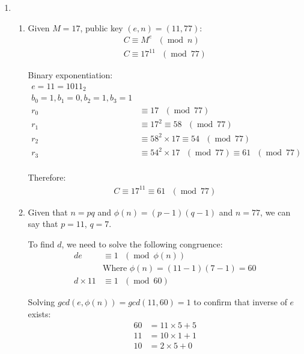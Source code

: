 \documentclass[11pt]{article}
\theoremstyle{definition}
\renewcommand{\pmod}[1]{\mbox{\ $(\ensuremath{\operatorname{mod}}\ {#1})$}}
\begin{document}
\begin{enumerate}
\begin{enumerate}
  \item
    \begin{enumerate}
      \item 
        Given $M = 17$, public key $(e, n) = (11, 77)$:
        \begin{align*}
          C \equiv M^e \pmod{n} \\
          C \equiv 17^{11} \pmod{77}
        \end{align*}

        Binary exponentiation:
        \begin{align*}
          e = 11 = 1011_{2} \\
          b_0 = 1, b_1 = 0, b_2 = 1, b_3 = 1 \\
          r_0 &\equiv 17 \pmod{77} \\
          r_1 &\equiv 17^2 \equiv 58 \pmod{77} \\
          r_2 &\equiv 58^2 \times 17 \equiv 54 \pmod{77}  \\
          r_3 &\equiv 54^2 \times 17 \pmod{77} \equiv 61 \pmod{77}  \\
        \end{align*}

        Therefore:
        \begin{align*}
          C \equiv 17^{11} \equiv 61 \pmod{77}
        \end{align*}
      \item
        Given that $n = pq$ and $\phi{(n)} = (p - 1)(q - 1)$ and $n = 77$, we can say that $p = 11$, $q = 7$.

        To find $d$, we need to solve the following congruence:
        \begin{align*}
          de &\equiv 1 \pmod{\phi{(n)}} \\
             &\text{Where } \phi{(n)} = (11 - 1)(7 - 1) = 60 \\
          d \times 11 &\equiv 1 \pmod{60}
        \end{align*}

        Solving $gcd(e, \phi{(n)}) = gcd(11, 60) = 1$ to confirm that inverse of $e$ exists:
        \begin{align*}
          60 &= 11 \times 5 + 5 \\
          11 &= 10 \times 1 + 1 \\
          10 &= 2 \times 5 + 0 \\
        \end{align*}


\end{enumerate}
\end{enumerate}
\end{enumerate}
\end{document}
